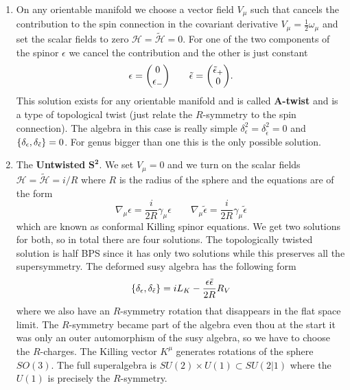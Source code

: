 \documentclass[11pt]{article}
\theoremstyle{definition}
\numberwithin{equation}{section}
\begin{document}
\begin{enumerate}
	\item On any orientable manifold we choose a vector field $V_{\mu}$ such that cancels the contribution to the spin connection in the covariant derivative $V_{\mu} = \frac{1}{2}\omega_{\mu}$ and set the scalar fields to zero $\mathcal{H}=\tilde{\mathcal{H}}=0$. For one of the two components of the spinor $\epsilon$ we cancel the contribution and the other is just constant 
	\begin{equation}
		\epsilon = \mqty(0 \\ \epsilon_{-}) \qquad \tilde{\epsilon} = \mqty(\tilde{\epsilon}_{+}\\0).
	\end{equation}
	This solution exists for any orientable manifold and is called \textbf{A-twist} and is a type of topological twist (just relate the $R$-symmetry to the spin connection). The algebra in this case is really simple $\delta_{\epsilon}^{2}=\delta_{\tilde{\epsilon}}^{2}=0$ and $\acomm{\delta_{\epsilon}}{\delta_{\tilde{\epsilon}}}=0$. For genus bigger than one this is the only possible solution.
	\item The \textbf{Untwisted} $\mathbf{S^{2}}$. We set $V_{\mu}=0$ and we turn on the scalar fields $\mathcal{H}=\tilde{\mathcal{H}}=i/R$ where $R$ is the radius of the sphere and the equations are of the form
	\begin{equation}
		\nabla_{\mu}\epsilon = \frac{i}{2R}\gamma_{\mu}\epsilon\qquad \nabla_{\mu}\tilde{\epsilon} = \frac{i}{2R}\gamma_{\mu}\tilde{\epsilon}
	\end{equation}
	which are known as conformal Killing spinor equations. We get two solutions for both, so in total there are four solutions. The topologically twisted solution is half BPS since it has only two solutions while this preserves all the supersymmetry. The deformed susy algebra has the following form
	\begin{equation}
		\acomm{\delta_{\epsilon}}{\delta_{\tilde{\epsilon}}} = iL_{K}-\frac{\epsilon\tilde{\epsilon}}{2R}R_{V}
	\end{equation}
	where we also have an $R$-symmetry rotation that disappears in the flat space limit. The $R$-symmetry became part of the algebra even thou at the start it was only an outer automorphism of the susy algebra, so we have to choose the $R$-charges. The Killing vector $K^{\mu}$ generates rotations of the sphere $SO(3)$. The full superalgebra is $SU(2)\times U(1)\subset SU(2|1)$ where the $U(1)$ is precisely the $R$-symmetry.
\end{enumerate}
\end{document}
